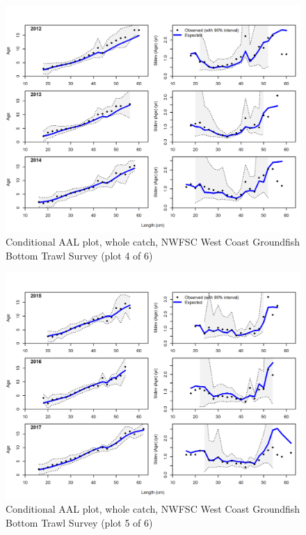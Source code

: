 \documentclass[12pt,]{article}
\begin{document}
\begin{figure}
\centering
\includegraphics{r4ss/plots_mod1/comp_condAALfit_Andre_plotsflt7mkt0_page4.png}
\caption{Conditional AAL plot, whole catch, NWFSC West Coast Groundfish
Bottom Trawl Survey (plot 4 of 6) \label{fig:nwfsc_combo_andre_4}}
\end{figure}

\begin{figure}
\centering
\includegraphics{r4ss/plots_mod1/comp_condAALfit_Andre_plotsflt7mkt0_page5.png}
\caption{Conditional AAL plot, whole catch, NWFSC West Coast Groundfish
Bottom Trawl Survey (plot 5 of 6) \label{fig:nwfsc_combo_andre_5}}
\end{figure}
\end{document}
